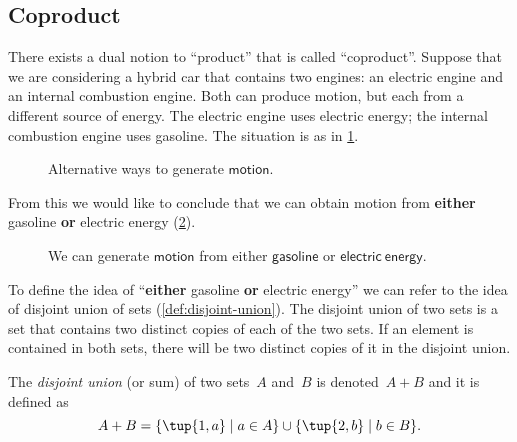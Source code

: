 \label{sec:coproductset}
\subsection{Coproduct}

There exists a dual notion to ``product'' that is called ``coproduct''. Suppose that we are considering a hybrid car that contains two engines: an
electric engine and an internal combustion engine. Both can produce \textsf{motion}, but each from a different source of energy. The electric engine uses \textsf{electric energy}; the internal combustion engine uses \textsf{gasoline}. The situation is as in \cref{fig:e16a}.

\begin{figure}[h!]
    \centering
    \caption{Alternative ways to generate $\mathsf{motion}$. \label{fig:e16a}}
\end{figure}

From this we would like to conclude that we can obtain \textsf{motion} from \textbf{either} \textsf{gasoline} \textbf{or} \textsf{electric energy} (\cref{fig:e16b}).

\begin{figure}[h!]
    \centering
    \caption{We can generate $\mathsf{motion}$ from either $\mathsf{gasoline}$ or $\mathsf{electric} \ \mathsf{energy}$. \label{fig:e16b}}
\end{figure}

To define the idea of ``\textbf{either} \textsf{gasoline} \textbf{or} \textsf{electric energy}'' we can refer to the idea of disjoint union of sets (\cref{def:disjoint-union}). The disjoint union of two sets is a set that contains two distinct copies of each of the two sets. If an element is contained in both sets, there will be two distinct copies of it in the disjoint union.

\begin{definition}
\label{def:disjoint-union}
    The \emph{disjoint union} (or sum) of two sets~$A$ and~$B$ is denoted~$A + B$
    and it is defined as
    \begin{equation}
        A + B=\{\tup{1,a}\mid a\in A\}\cup\{\tup{2,b}\mid b\in B\}.
    \end{equation}
\end{definition}

